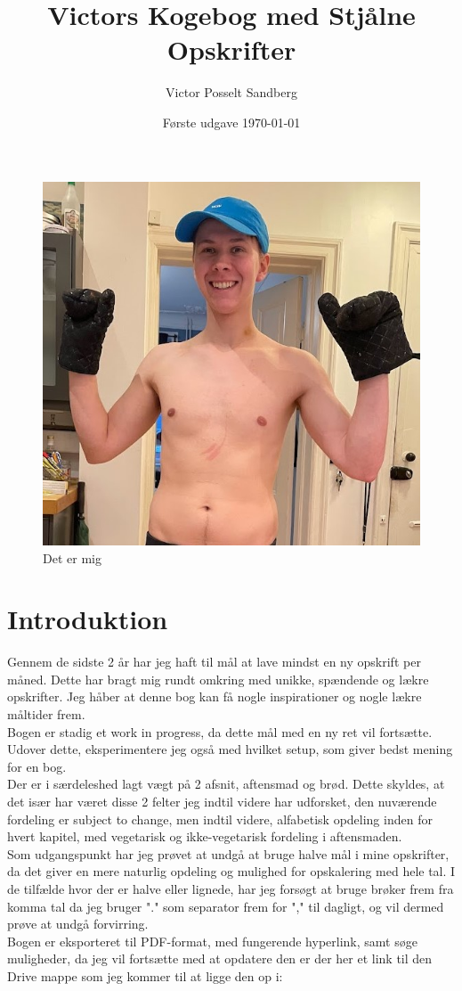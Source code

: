 \documentclass{book}
\title{Victors Kogebog med Stjålne Opskrifter}
\author{Victor Posselt Sandberg}
\date{Første udgave \quad \today}
\begin{document}
\dominitoc  

\frontmatter
\maketitle 
\begin{figure}
    \centering
    \includegraphics[width=1\linewidth]{Billeder/Mave2.jpg}
    \caption{Det er mig}
\end{figure}
\newpage \tableofcontents
\mainmatter
\newpage\chapter{Introduktion} 
Gennem de sidste 2 år har jeg haft til mål at lave mindst en ny opskrift per måned. Dette har bragt mig rundt omkring med unikke, spændende og lækre opskrifter. Jeg håber at denne bog kan få nogle inspirationer og nogle lækre måltider frem. 
\\Bogen er stadig et work in progress, da dette mål med en ny ret vil fortsætte. Udover dette, eksperimentere jeg også med hvilket setup, som giver bedst mening for en bog.
\\ Der er i særdeleshed lagt vægt på 2 afsnit, aftensmad og brød. Dette skyldes, at det især har været disse 2 felter jeg indtil videre har udforsket, den nuværende fordeling er subject to change, men indtil videre, alfabetisk opdeling inden for hvert kapitel, med vegetarisk og ikke-vegetarisk fordeling i aftensmaden. \\ Som udgangspunkt har jeg prøvet at undgå at bruge halve mål i mine opskrifter, da det giver en mere naturlig opdeling og mulighed for opskalering med hele tal. I de tilfælde hvor der er halve eller lignede, har jeg forsøgt at bruge brøker frem fra komma tal da jeg bruger "." som separator frem for "," til dagligt, og vil dermed prøve at undgå forvirring. \\ Bogen er eksporteret til PDF-format, med fungerende hyperlink, samt søge muligheder, da jeg vil fortsætte med at opdatere den er der her et link til den Drive mappe som jeg kommer til at ligge den op i: \\ 
\end{document}
